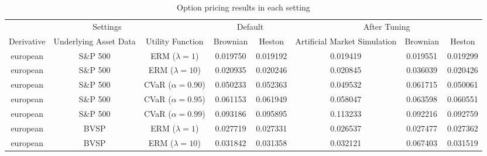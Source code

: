 \begin{table*}[htb]
    \caption{Option pricing results in each setting}
    \label{tab:results}
    \centering
    \begin{tabular}{ccc|cc|ccc}
        \hline
        \multicolumn{3}{c|}{Settings} & \multicolumn{2}{c|}{Default} & \multicolumn{3}{c}{After Tuning}                                                                                                                        \\
        Derivative                    & Underlying Asset Data        & Utility Function                 & Brownian            & Heston              & Artificial Market Simulation & Brownian            & Heston              \\\hline
        european                      & S\&P 500                     & ERM ($\lambda=1$)                & 0.019750            & \color{red}0.019192 & 0.019419                     & 0.019551            & 0.019299            \\
        european                      & S\&P 500                     & ERM ($\lambda=10$)               & 0.020935            & \color{red}0.020246 & 0.020845                     & 0.036039            & 0.020426            \\
        european                      & S\&P 500                     & CVaR ($\alpha=0.90$)             & 0.050233            & 0.052363            & \color{red}0.049532          & 0.061715            & 0.050061            \\
        european                      & S\&P 500                     & CVaR ($\alpha=0.95$)             & 0.061153            & 0.061949            & \color{red}0.058047          & 0.063598            & 0.060551            \\
        european                      & S\&P 500                     & CVaR ($\alpha=0.99$)             & 0.093186            & 0.095895            & 0.113233                     & \color{red}0.092216 & 0.092759            \\\hline
        european                      & BVSP                         & ERM ($\lambda=1$)                & 0.027719            & 0.027331            & \color{red}0.026537          & 0.027477            & 0.027362            \\
        european                      & BVSP                         & ERM ($\lambda=10$)               & 0.031842            & \color{red}0.031358 & 0.032121                     & 0.067403            & 0.031519            \\

\end{tabular}
\end{table*}
